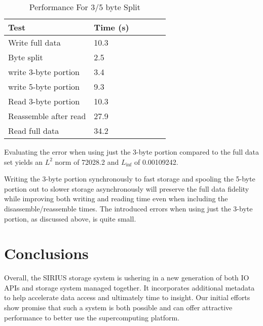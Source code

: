 \documentclass[letterpaper,twocolumn,10pt]{article}
\begin{document}
\begin{table}[tbp]
\centering
\caption{Performance For 3/5 byte Split}
\label{tab:performance}
\begin{tabular}{|l|l|l|l|l|l|}
\hline
Test & Time (s)\\
\hline
Write full data & 10.3 \\
\hline
Byte split & 2.5 \\
\hline
write 3-byte portion & 3.4 \\
\hline
write 5-byte portion & 9.3 \\
\hline
\hline
Read 3-byte portion & 10.3 \\
\hline
Reassemble after read & 27.9 \\
\hline
Read full data & 34.2 \\
\hline
\end{tabular}
\end{table}

Evaluating the error when using just the 3-byte portion compared to the full
data set yields an $L^2$ norm of 72028.2 and $L_{\inf}$ of 0.00109242.

Writing the 3-byte portion synchronously to fast storage and spooling the
5-byte portion out to slower storage asynchronously will preserve the full data
fidelity while improving both writing and reading time even when including the
disassemble/reassemble times. The introduced errors when using just the 3-byte
portion, as discussed above, is quite small.

\section{Conclusions}
\label{sec:conclusion}

Overall, the SIRIUS storage system is ushering in a new generation of both IO
APIs and storage system managed together. It incorporates additional metadata
to help accelerate data access and ultimately time to insight. Our initial
efforts show promise that such a system is both possible and can offer
attractive performance to better use the supercomputing platform.

%
%
\end{document}
